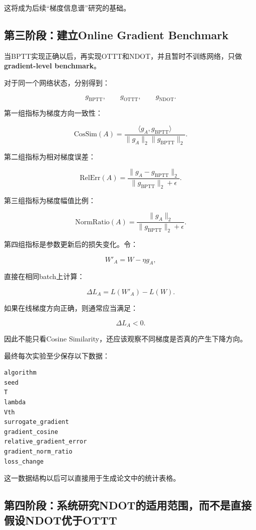 \documentclass[journal,12pt,onecolumn]{IEEEtran}
\begin{document}
这将成为后续“梯度信息谱”研究的基础。


\subsection{第三阶段：建立Online Gradient Benchmark}

当BPTT实现正确以后，再实现OTTT和NDOT，并且暂时不训练网络，只做\textbf{gradient-level benchmark}。

对于同一个网络状态，分别得到：

\[
g_{\mathrm{BPTT}},
\qquad
g_{\mathrm{OTTT}},
\qquad
g_{\mathrm{NDOT}}.
\]

第一组指标为梯度方向一致性：

\[
\mathrm{CosSim}(A)
=
\frac{
\langle g_A,g_{\mathrm{BPTT}}\rangle
}{
\|g_A\|_2
\|g_{\mathrm{BPTT}}\|_2
}.
\]

第二组指标为相对梯度误差：

\[
\mathrm{RelErr}(A)
=
\frac{
\|g_A-g_{\mathrm{BPTT}}\|_2
}{
\|g_{\mathrm{BPTT}}\|_2+\epsilon
}.
\]

第三组指标为梯度幅值比例：

\[
\mathrm{NormRatio}(A)
=
\frac{\|g_A\|_2}
{\|g_{\mathrm{BPTT}}\|_2+\epsilon}.
\]

第四组指标是参数更新后的损失变化。令：

\[
W'_A=W-\eta g_A,
\]

直接在相同batch上计算：

\[
\Delta L_A=L(W'_A)-L(W).
\]

如果在线梯度方向正确，则通常应当满足：

\[
\Delta L_A<0.
\]

因此不能只看Cosine Similarity，还应该观察不同梯度是否真的产生下降方向。

最终每次实验至少保存以下数据：

\begin{verbatim}
algorithm
seed
T
lambda
Vth
surrogate_gradient
gradient_cosine
relative_gradient_error
gradient_norm_ratio
loss_change
\end{verbatim}

这一数据结构以后可以直接用于生成论文中的统计表格。


\subsection{第四阶段：系统研究NDOT的适用范围，而不是直接假设NDOT优于OTTT}
\end{document}
